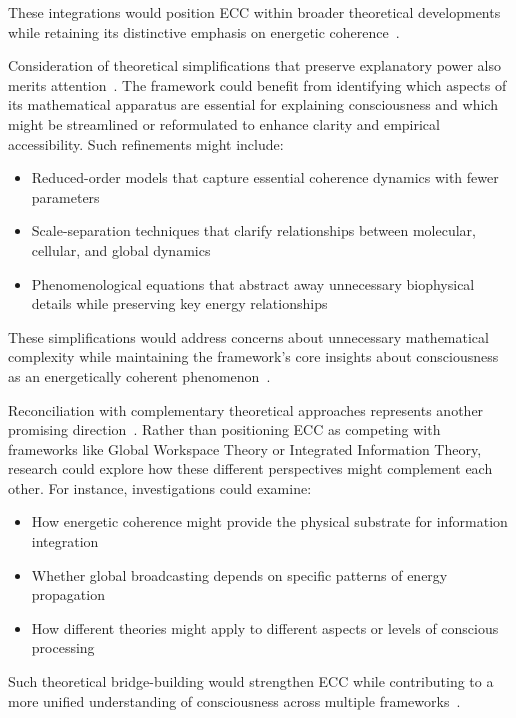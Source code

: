 These integrations would position ECC within broader theoretical developments while retaining its distinctive emphasis on energetic coherence~\cite{thompson2014waking, koch2019feeling}.

Consideration of theoretical simplifications that preserve explanatory power also merits attention~\cite{chalmers2010character, dennett2017bacteria}. The framework could benefit from identifying which aspects of its mathematical apparatus are essential for explaining consciousness and which might be streamlined or reformulated to enhance clarity and empirical accessibility. Such refinements might include:

\begin{itemize}
    \item Reduced-order models that capture essential coherence dynamics with fewer parameters
    \item Scale-separation techniques that clarify relationships between molecular, cellular, and global dynamics
    \item Phenomenological equations that abstract away unnecessary biophysical details while preserving key energy relationships
\end{itemize}

These simplifications would address concerns about unnecessary mathematical complexity while maintaining the framework's core insights about consciousness as an energetically coherent phenomenon~\cite{koch2019feeling, goff2019galileo}.

Reconciliation with complementary theoretical approaches represents another promising direction~\cite{tononi2016integrated}. Rather than positioning ECC as competing with frameworks like Global Workspace Theory or Integrated Information Theory, research could explore how these different perspectives might complement each other. For instance, investigations could examine:

\begin{itemize}
    \item How energetic coherence might provide the physical substrate for information integration
    \item Whether global broadcasting depends on specific patterns of energy propagation
    \item How different theories might apply to different aspects or levels of conscious processing
\end{itemize}

Such theoretical bridge-building would strengthen ECC while contributing to a more unified understanding of consciousness across multiple frameworks~\cite{chalmers2010character, seth2021being}.

